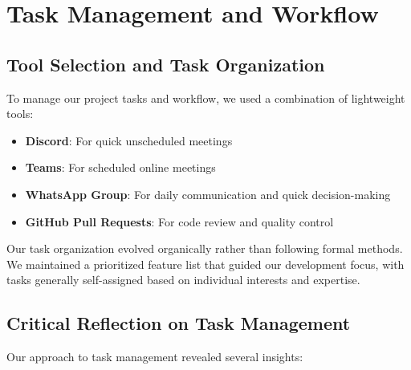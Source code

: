 \section{Task Management and Workflow}

\subsection{Tool Selection and Task Organization}

To manage our project tasks and workflow, we used a combination of lightweight tools:

\begin{itemize}
    \item \textbf{Discord}: For quick unscheduled meetings
    
    \item \textbf{Teams}: For scheduled online meetings
    
    \item \textbf{WhatsApp Group}: For daily communication and quick decision-making
    
    \item \textbf{GitHub Pull Requests}: For code review and quality control
\end{itemize}

Our task organization evolved organically rather than following formal methods. We maintained a prioritized feature list that guided our development focus, with tasks generally self-assigned based on individual interests and expertise.

\subsection{Critical Reflection on Task Management}

Our approach to task management revealed several insights:

